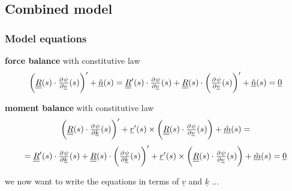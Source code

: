 \subsection{Combined model}

\begin{frame}
  \frametitle{Model equations}
  
  \textbf{force balance} with constitutive law
  \begin{displaymath}
    \biggl( \doubleunderline{R}(s) \cdot \pd{\psi}{\underline{v}}(s) \biggr)^{\prime} + \underline{\hat{n}}(s) = 
    \doubleunderline{R}^{\prime}(s) \cdot \pd{\psi}{\underline{v}}(s) +
    \doubleunderline{R}(s) \cdot \biggl( \pd{\psi}{\underline{v}}(s) \biggr)^{\prime} +
    \underline{\hat{n}}(s) =
    \underline{0}
  \end{displaymath}
  
  \vspace{1em}
  \textbf{moment balance} with constitutive law
  \begin{displaymath}
    \biggl( \doubleunderline{R}(s) \cdot \pd{\psi}{\underline{k}}(s) \biggr)^{\prime} +
    \underline{r}^{\prime}(s) \times \biggl( \doubleunderline{R}(s) \cdot \pd{\psi}{\underline{v}}(s) \biggr) +
    \underline{\hat{m}}(s) =
  \end{displaymath}
  \begin{displaymath}
    = 
    \doubleunderline{R}^{\prime}(s) \cdot \pd{\psi}{\underline{k}}(s) +
    \doubleunderline{R}(s) \cdot \biggl( \pd{\psi}{\underline{k}}(s) \biggr)^{\prime} +
    \underline{r}^{\prime}(s) \times \biggl( \doubleunderline{R}(s) \cdot \pd{\psi}{\underline{v}}(s) \biggr) +
    \underline{\hat{m}}(s) =
    \underline{0}
  \end{displaymath}
  
  \vspace{1em}
  we now want to write the equations in terms of $\underline{v}$ and $\underline{k}$ ...
\end{frame}


